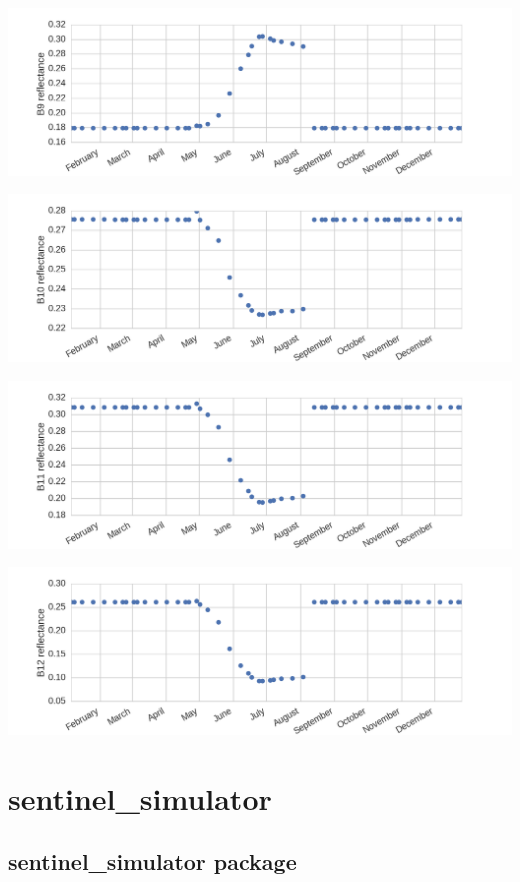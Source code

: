 \documentclass[letterpaper,10pt,english]{sphinxmanual}
\begin{document}
\includegraphics{B9.png}

\includegraphics{B10.png}

\includegraphics{B11.png}

\includegraphics{B12.png}


\section{sentinel\_simulator}
\label{source/modules::doc}\label{source/modules:sentinel-simulator}

\subsection{sentinel\_simulator package}
\label{source/sentinel_simulator:sentinel-simulator-package}\label{source/sentinel_simulator::doc}
\end{document}

